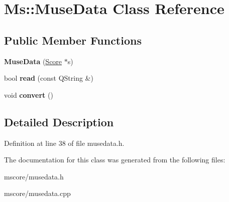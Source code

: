 \hypertarget{class_ms_1_1_muse_data}{}\section{Ms\+:\+:Muse\+Data Class Reference}
\label{class_ms_1_1_muse_data}
\subsection*{Public Member Functions}
\begin{DoxyCompactItemize}
\item 
\mbox{\label{class_ms_1_1_muse_data_ab5862c439c44818c1b9555fb4f906471}} 
{\bfseries Muse\+Data} (\hyperlink{class_ms_1_1_score}{Score} $\ast$s)
\item 
\mbox{\label{class_ms_1_1_muse_data_aaa76f7e0a5d77d6649d7bf9f786c92f9}} 
bool {\bfseries read} (const Q\+String \&)
\item 
\mbox{\label{class_ms_1_1_muse_data_afb1672cba7e08b5b8fb0dcd66ccc84b5}} 
void {\bfseries convert} ()
\end{DoxyCompactItemize}


\subsection{Detailed Description}


Definition at line 38 of file musedata.\+h.



The documentation for this class was generated from the following files\+:\begin{DoxyCompactItemize}
\item 
mscore/musedata.\+h\item 
mscore/musedata.\+cpp\end{DoxyCompactItemize}
